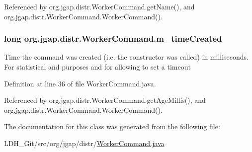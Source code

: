 Referenced by org.\-jgap.\-distr.\-Worker\-Command.\-get\-Name(), and org.\-jgap.\-distr.\-Worker\-Command.\-Worker\-Command().

\hypertarget{classorg_1_1jgap_1_1distr_1_1_worker_command_aa1595efb017c30d50dbb49a1d6932776}{
\subsubsection[{m\-\_\-time\-Created}]{\setlength{\rightskip}{0pt plus 5cm}long org.\-jgap.\-distr.\-Worker\-Command.\-m\-\_\-time\-Created\hspace{0.3cm}{\ttfamily [private]}}}\label{classorg_1_1jgap_1_1distr_1_1_worker_command_aa1595efb017c30d50dbb49a1d6932776}
Time the command was created (i.\-e. the constructor was called) in milliseconds. For statistical and purposes and for allowing to set a timeout 

Definition at line 36 of file Worker\-Command.\-java.



Referenced by org.\-jgap.\-distr.\-Worker\-Command.\-get\-Age\-Millis(), and org.\-jgap.\-distr.\-Worker\-Command.\-Worker\-Command().



The documentation for this class was generated from the following file\-:\begin{DoxyCompactItemize}
\item 
L\-D\-H\-\_\-\-Git/src/org/jgap/distr/\hyperlink{_worker_command_8java}{Worker\-Command.\-java}\end{DoxyCompactItemize}
